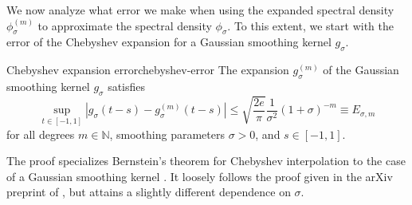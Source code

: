 We now analyze what error we make when using the expanded spectral density $\phi_{\sigma}^{(m)}$ to approximate the spectral density $\phi_{\sigma}$. To this extent, we start with the error of the Chebyshev expansion for a Gaussian smoothing kernel $g_{\sigma}$.

\begin{lemma}{Chebyshev expansion error}{chebyshev-error}
    The expansion $g_{\sigma}^{(m)}$ of the Gaussian smoothing kernel $g_{{\sigma}}$  satisfies
    \begin{equation}
        \sup_{t \in [-1, 1]} \left| g_{\sigma}(t - s) - g_{\sigma}^{(m)}(t - s) \right| \leq \sqrt{\frac{2e}{\pi}} \frac{1}{\sigma^2} (1 + \sigma)^{-m} \equiv E_{\sigma, m}
        \label{equ:chebyshev-interpolation-sup-error-kernel}
    \end{equation}
    for all degrees $m \in \mathbb{N}$, smoothing parameters $\sigma > 0$, and $s \in [-1, 1]$.
\end{lemma}

The proof specializes Bernstein's theorem for Chebyshev interpolation to the case of a Gaussian smoothing kernel . It loosely follows the proof given in the arXiv preprint of \cite[Theorem 2]{lin-2017-randomized-estimation}, but attains a slightly different dependence on $\sigma$. \\ \vspace{\parskip}

